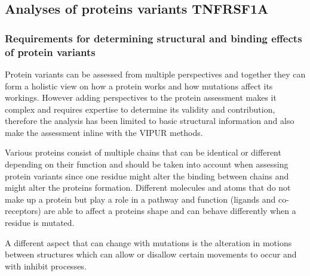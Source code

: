 \newpage
\subsection{Analyses of proteins variants TNFRSF1A}
	\subsubsection{Requirements for determining structural and binding effects of protein variants}
	Protein variants can be assessed from multiple perspectives and together they can form a holistic view on how a protein works and how mutations affect its workings. However adding perspectives to the protein assessment makes it complex and requires expertise to determine its validity and contribution, therefore the analysis has been limited to basic structural information and also make the assessment inline with the VIPUR methods.
	
	Various proteins consist of multiple chains that can be identical or different depending on their function \cite{liu_lipin_2010} and should be taken into account when assessing protein variants since one residue might alter the binding between chains and might alter the proteins formation. 
	Different molecules and atoms that do not make up a protein but play a role in a pathway and function (ligands and co-receptors) are able to affect a proteins shape and can behave differently when a residue is mutated. 
	
	A different aspect that can change with mutations is the alteration in motions between structures which can allow or disallow certain movements to occur and with inhibit processes.
	
